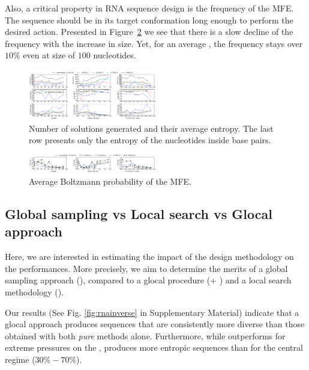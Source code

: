 
Also, a critical property in RNA sequence design is 
the frequency of the MFE. 
The sequence should be in its target conformation long enough to
perform the desired action. Presented in Figure~\ref{fig:freq} we see that
there is a slow decline of the frequency with the increase in size. Yet,
for an average \GCContent, the frequency stays over $10\%$ even
at size of $100$ nucleotides.


\begin{figure}[ht!]
	\centering
	\includegraphics[width=0.5\textwidth]{Figures/nb_sols_entropy.png}
	\caption{Number of solutions generated and their average entropy. 
	The last row presents only the entropy of the nucleotides inside base 
	pairs.}
	\label{fig:nb_sols_entropy}
\end{figure}



\begin{figure}[ht!]
	\centering
	\includegraphics[width=0.5\textwidth]{Figures/freq.png}
	\caption{Average Boltzmann probability of the MFE.}
	\label{fig:freq}
\end{figure}

\subsection{Global sampling vs Local search vs Glocal approach}


Here, we are interested in estimating the impact of the design methodology on the performances. More precisely, we aim to determine the merits of a global sampling approach (\ourprog), compared to a glocal procedure (\ourprog + \RNAinverse) and a local search methodology (\RNAinverse). 

Our results (See Fig. \ref{fig:rnainverse} in Supplementary Material) indicate that a glocal approach produces sequences that are consistently more diverse than those obtained with both {\em pure} methods alone. Furthermore, while \ourprog outperforms \RNAinverse for extreme pressures on the \GCContent, \RNAinverse produces more entropic sequences than \ourprog for the central \GCContent regime ($30\%-70\%$). 

